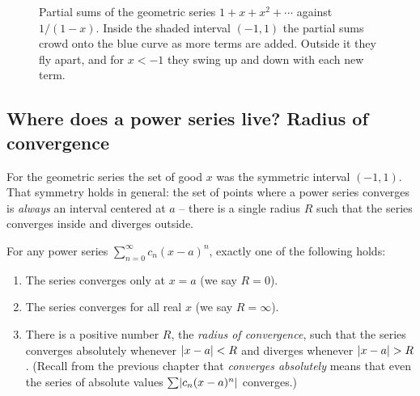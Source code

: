 \begin{figure}[htbp]
\centering
{}
\caption{Partial sums of the geometric series $1 + x + x^2 + \cdots$ against $1/(1-x)$. Inside the shaded interval $(-1,1)$ the partial sums crowd onto the blue curve as more terms are added. Outside it they fly apart, and for $x<-1$ they swing up and down with each new term.}
\label{ch30:fig-geometric-partial}
\end{figure}

\subsection{Where does a power series live? Radius of convergence}

For the geometric series the set of good $x$ was the symmetric interval $(-1,1)$. That symmetry holds in general: the set of points where a power series converges is \emph{always} an interval centered at $a$ -- there is a single radius $R$ such that the series converges inside and diverges outside.

\begin{theorem}
\label{ch30:thm-radius}
For any power series $\sum_{n=0}^{\infty} c_n (x-a)^n$, exactly one of the following holds:
\begin{enumerate}
  \item The series converges only at $x = a$ (we say $R = 0$).
  \item The series converges for all real $x$ (we say $R = \infty$).
  \item There is a positive number $R$, the \emph{radius of convergence}, such that the series converges absolutely whenever $\lvert x-a\rvert < R$ and diverges whenever $\lvert x-a\rvert > R$. (Recall from the previous chapter that \emph{converges absolutely} means that even the series of absolute values $\sum \lvert c_n(x-a)^n\rvert$ converges.)
\end{enumerate}
\end{theorem}

